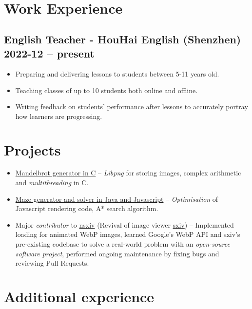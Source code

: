 \section{Work Experience}
\subsection{English Teacher - HouHai English (Shenzhen) \hfill 2022-12 --
present}
\begin{itemize}
    \item Preparing and delivering lessons to students between 5-11 years old.
    \item Teaching classes of up to 10 students both online and offline.
    \item Writing feedback on students' performance after lessons to accurately
        portray how learners are progressing.
\end{itemize}

\section{Projects}
        \begin{itemize}
            \item \href{https://github.com/Ytrewq13/mandelbrotc}{Mandelbrot generator in C}
    -- \emph{Libpng} for storing images, complex arithmetic and
    \emph{multithreading} in C.
            \item \href{https://github.com/Ytrewq13/mazemaker.git}{Maze generator and solver in Java and Javascript}
    -- \emph{Optimisation} of Javascript rendering code, A* search algorithm.
            \item Major \emph{contributor} to
                \href{https://github.com/nsxiv/nsxiv.git}{nsxiv} (Revival of
                image viewer \href{https://github.com/muennich/sxiv}{sxiv})
    -- Implemented loading for animated WebP images, learned Google's WebP API
    and sxiv's pre-existing codebase to solve a real-world problem with an
    \emph{open-source software project}, performed ongoing maintenance by
    fixing bugs and reviewing Pull Requests.
        \end{itemize}
\section{Additional experience}
